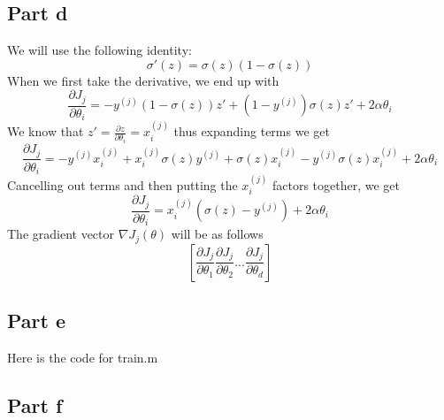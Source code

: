 \documentclass[twoside,11pt]{article}
\theoremstyle{definition}
\begin{document}
\subsection*{Part d}

We will use the following identity:
\[
\sigma'(z) = \sigma(z)(1-\sigma(z))
\]
When we first take the derivative, we end up with
\[
\frac{\partial J_j}{\partial \theta_i} = -y^{(j)} (1-\sigma(z)) z' + (1-y^{(j)}) \sigma(z) z' + 2 \alpha \theta_i
\]
We know that $z' = \frac{\partial z}{\partial \theta_i}= x_i^{(j)}$ thus expanding terms we get
\[
\frac{\partial J_j}{\partial \theta_i} = -y^{(j)}x_i^{(j)} + x_i^{(j)}\sigma(z)y^{(j)} + \sigma(z) x_i^{(j)} -y^{(j)} \sigma(z) x_i^{(j)} + 2 \alpha \theta_i
\]
Cancelling out terms and then putting the $x_i^{(j)}$ factors together, we get
\[
\frac{\partial J_j}{\partial \theta_i} = x_i^{(j)} (\sigma(z) - y^{(j)} ) + 2 \alpha \theta_i
\]
The gradient vector $\nabla J_j(\theta)$ will be as follows
\[
[\frac{\partial J_j}{\partial \theta_1} \frac{\partial J_j}{\partial \theta_2} ... \frac{\partial J_j}{\partial \theta_d}]
\]
\newpage
\subsection*{Part e}

Here is the code for train.m


\newpage

\subsection*{Part f}
\end{document}
